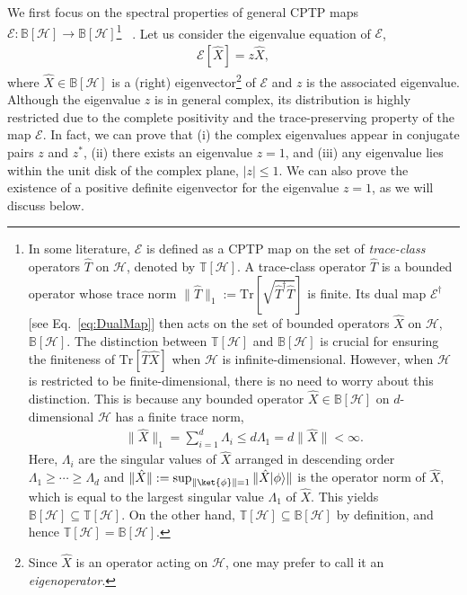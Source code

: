 \documentclass[preprint,pteplogo]{ptephy_v2}%
\numberwithin{equation}{section}
\theoremstyle{definition}
\newcommand{\mc}[1]{\mathcal{#1}}
\newcommand{\mr}[1]{\mathrm{#1}}
\newcommand{\mbb}[1]{\mathbb{#1}}
\newcommand{\Tr}{\mr{Tr}}
\begin{document}
We first focus on the spectral properties of general CPTP maps $\mc{E}: \mbb{B}[\mc{H}] \to \mbb{B}[\mc{H}]$\footnote{
In some literature, $\mc{E}$ is defined as a CPTP map on the set of \emph{trace-class} operators $\hat{T}$ on $\mc{H}$, denoted by $\mbb{T}[\mc{H}]$. 
A trace-class operator $\hat{T}$ is a bounded operator whose trace norm $\| \hat{T} \|_1 := \Tr [\sqrt{\hat{T}^\dagger \hat{T}}]$ is finite. 
Its dual map $\mc{E}^\dagger$ [see Eq.~\eqref{eq:DualMap}] then acts on the set of bounded operators $\hat{X}$ on $\mc{H}$, $\mbb{B}[\mc{H}]$. 
The distinction between $\mbb{T}[\mc{H}]$ and $\mbb{B}[\mc{H}]$ is crucial for ensuring the finiteness of $\Tr[\hat{T} \hat{X}]$ when $\mc{H}$ is infinite-dimensional.
However, when $\mc{H}$ is restricted to be finite-dimensional, there is no need to worry about this distinction. 
This is because any bounded operator $\hat{X} \in \mbb{B}[\mc{H}]$ on $d$-dimensional $\mc{H}$ has a finite trace norm, 
\begin{align*}
\| \hat{X} \|_1 = \sum_{i=1}^d \Lambda_i \leq d \Lambda_1 = d\| \hat{X} \| < \infty.
\end{align*}
Here, $\Lambda_i$ are the singular values of $\hat{X}$ arranged in descending order $\Lambda_1 \geq \cdots \geq \Lambda_d$ and $\| \hat{X} \| := \sup_{\|\ket{\phi}\|=1} \| \hat{X} |\phi \rangle \|$ is the operator norm of $\hat{X}$, which is equal to the largest singular value $\Lambda_1$ of $\hat{X}$. 
This yields $\mbb{B}[\mc{H}] \subseteq \mbb{T}[\mc{H}]$. 
On the other hand, $\mbb{T}[\mc{H}] \subseteq \mbb{B}[\mc{H}]$ by definition, and hence $\mbb{T}[\mc{H}] = \mbb{B}[\mc{H}]$.
}
~\cite{wolf2012quantum, bengtsson2020geometry}.
Let us consider the eigenvalue equation of $\mc{E}$, 
\begin{align} \label{eq:CPTPEigen}
\mc{E}[\hat{X}] = z \hat{X},
\end{align}
where $\hat{X} \in \mbb{B}[\mc{H}]$ is a (right) eigenvector\footnote{
Since $\hat{X}$ is an operator acting on $\mc{H}$, one may prefer to call it an \emph{eigenoperator}.
} of $\mc{E}$ and $z$ is the associated eigenvalue. 
Although the eigenvalue $z$ is in general complex, its distribution is highly restricted due to the complete positivity and the trace-preserving property of the map $\mc{E}$. 
In fact, we can prove that (i) the complex eigenvalues appear in conjugate pairs $z$ and $z^*$, (ii) there exists an eigenvalue $z=1$, and (iii) any eigenvalue lies within the unit disk of the complex plane, $|z| \leq 1$. 
We can also prove the existence of a positive definite eigenvector for the eigenvalue $z=1$, as we will discuss below.
\end{document}
